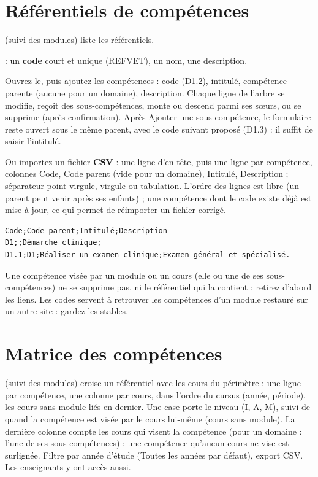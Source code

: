 \documentclass[11pt,a4paper]{article}
\begin{document}
\section{Référentiels de compétences}

 (suivi des modules) liste les référentiels.
\begin{etapes}
  \item {} : un \textbf{code} court et unique (\og REFVET\fg{}),
    un nom, une description.
  \item Ouvrez-le, puis ajoutez les compétences : code (\og D1.2\fg{}), intitulé, compétence
    parente (aucune pour un domaine), description. Chaque ligne de l'arbre se modifie, reçoit
    des sous-compétences, monte ou descend parmi ses s\oe urs, ou se supprime (après
    confirmation). Après \og Ajouter une sous-compétence\fg{}, le formulaire reste ouvert sous
    le même parent, avec le code suivant proposé (\og D1.3\fg{}) : il suffit de saisir
    l'intitulé.
  \item Ou importez un fichier \textbf{CSV} : une ligne d'en-tête, puis une ligne par
    compétence, colonnes \og Code\fg{}, \og Code parent\fg{} (vide pour un domaine),
    \og Intitulé\fg{}, \og Description\fg{} ; séparateur point-virgule, virgule ou tabulation.
    L'ordre des lignes est libre (un parent peut venir après ses enfants) ; une compétence dont
    le code existe déjà est mise à jour, ce qui permet de réimporter un fichier corrigé.
\end{etapes}

\begin{verbatim}
Code;Code parent;Intitulé;Description
D1;;Démarche clinique;
D1.1;D1;Réaliser un examen clinique;Examen général et spécialisé.
\end{verbatim}


Une compétence visée par un module ou un cours (elle ou une de ses sous-compétences) ne se
supprime pas, ni le référentiel qui la contient : retirez d'abord les liens. Les codes servent
à retrouver les compétences d'un module restauré sur un autre site : gardez-les stables.

\section{Matrice des compétences}

 (suivi des modules) croise un référentiel avec les cours du périmètre :
une ligne par compétence, une colonne par cours, dans l'ordre du cursus (année, période), les
cours sans module liés en dernier.
Une case porte le niveau (I, A, M), suivi de \og *\fg{} quand la compétence est visée par le
cours lui-même (cours sans module). La dernière colonne compte les cours qui visent la
compétence (pour un domaine : l'une de ses sous-compétences) ; une compétence qu'aucun cours ne
vise est surlignée. Filtre par année d'étude (\og Toutes les années\fg{} par défaut), export CSV.
Les enseignants y ont accès aussi.
\end{document}

